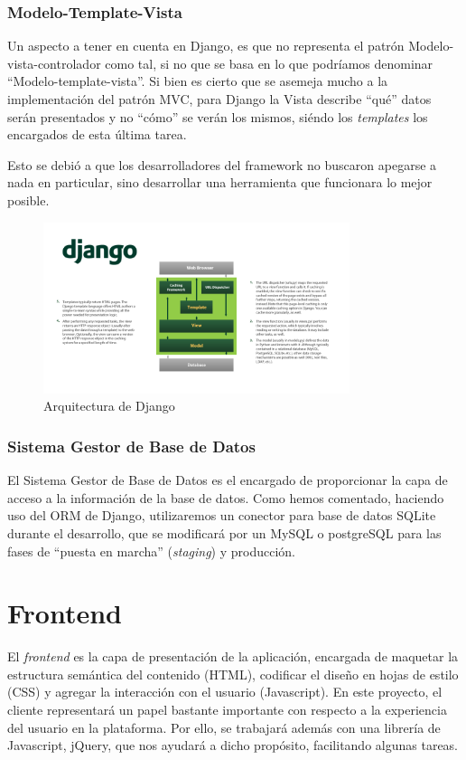\subsubsection{Modelo-Template-Vista}
Un aspecto a tener en cuenta en Django, es que no representa el patrón Modelo-vista-controlador como tal, si no que se basa en lo que podríamos denominar ``Modelo-template-vista''. Si bien es cierto que se asemeja mucho a la implementación del patrón MVC, para Django la Vista describe ``qué'' datos serán presentados y no ``cómo'' se verán los mismos, siéndo los \textit{templates} los encargados de esta última tarea.

Esto se debió a que los desarrolladores del framework no buscaron apegarse a nada en particular, sino desarrollar una herramienta que funcionara lo mejor posible.

\begin{figure}[H]
  \begin{center}
  \includegraphics[width=0.8\textwidth]{../images/django_arch.png}
  \caption{Arquitectura de Django}
  \label{fig:django_arch}
  \end{center}
\end{figure}

\subsubsection{Sistema Gestor de Base de Datos}
El Sistema Gestor de Base de Datos es el encargado de proporcionar la capa de acceso a la información de la base de datos. Como hemos comentado, haciendo uso del ORM de Django, utilizaremos un conector para base de datos SQLite durante el desarrollo, que se modificará por un MySQL o postgreSQL para las fases de ``puesta en marcha'' (\textit{staging}) y producción.

\section{Frontend}
El \textit{frontend} es la capa de presentación de la aplicación, encargada de maquetar la estructura semántica del contenido (HTML), codificar el diseño en hojas de estilo (CSS) y agregar la interacción con el usuario (Javascript). En este proyecto, el cliente representará un papel bastante importante con respecto a la experiencia del usuario en la plataforma. Por ello, se trabajará además con una librería de Javascript, jQuery, que nos ayudará a dicho propósito, facilitando algunas tareas. 

